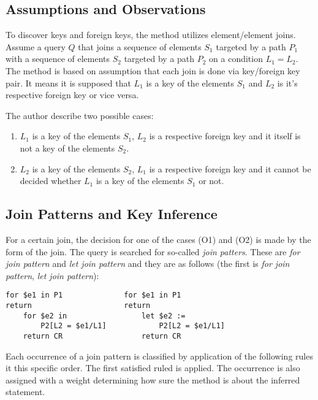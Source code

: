\subsection{Assumptions and Observations}
To discover keys and foreign keys, the method utilizes element/element joins. Assume a query $Q$ that joins a sequence of elements $S_1$ targeted by a path $P_1$ with a sequence of elements $S_2$ targeted by a path $P_2$ on a condition $L_1 = L_2$.
The method is based on assumption that each join is done via key/foreign key pair. It means it is supposed that $L_1$ is a key of the elements $S_1$ and $L_2$ is it's respective foreign key or vice versa.

The author describe two possible cases:

\begin{enumerate}
\renewcommand{\theenumi}{(O\arabic{enumi})}
\renewcommand{\labelenumi}{\theenumi}
\item $L_1$ is a key of the elements $S_1$, $L_2$ is a respective foreign key and it itself is not a key of the elements $S_2$.
\item $L_2$ is a key of the elements $S_2$, $L_1$ is a respective foreign key and it cannot be decided whether $L_1$ is a key of the elements $S_1$ or not.
\end{enumerate}

\subsection{Join Patterns and Key Inference}
For a certain join, the decision for one of the cases (O1) and (O2) is made by the form of the join. The query is searched for so-called \emph{join patters}. These are \emph{for join pattern} and \emph{let join pattern} and they are as follows (the first is \emph{for join pattern}, \emph{let join pattern}):

\begin{verbatim}
for $e1 in P1              for $e1 in P1
return                     return
    for $e2 in                 let $e2 :=
        P2[L2 = $e1/L1]            P2[L2 = $e1/L1]
    return CR                  return CR
\end{verbatim}

Each occurrence of a join pattern is classified by application of the following rules it this specific order. The first satisfied ruled is applied. The occurrence is also assigned with a weight determining how sure the method is about the inferred statement.

